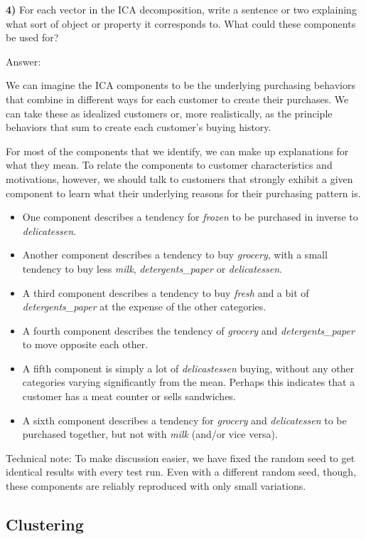 \documentclass{article}
\begin{document}
    \textbf{4)} For each vector in the ICA decomposition, write a sentence
or two explaining what sort of object or property it corresponds to.
What could these components be used for?

    Answer:

We can imagine the ICA components to be the underlying purchasing
behaviors that combine in different ways for each customer to create
their purchases. We can take these as idealized customers or, more
realistically, as the principle behaviors that sum to create each
customer's buying history.

For most of the components that we identify, we can make up explanations
for what they mean. To relate the components to customer characteristics
and motivations, however, we should talk to customers that strongly
exhibit a given component to learn what their underlying reasons for
their purchasing pattern is.

\begin{itemize}
\item
  One component describes a tendency for \emph{frozen} to be purchased
  in inverse to \emph{delicatessen}.
\item
  Another component describes a tendency to buy \emph{grocery}, with a
  small tendency to buy less \emph{milk}, \emph{detergents\_paper} or
  \emph{delicatessen}.
\item
  A third component describes a tendency to buy \emph{fresh} and a bit
  of \emph{detergents\_paper} at the expense of the other categories.
\item
  A fourth component describes the tendency of \emph{grocery} and
  \emph{detergents\_paper} to move opposite each other.
\item
  A fifth component is simply a lot of \emph{delicastessen} buying,
  without any other categories varying significantly from the mean.
  Perhaps this indicates that a customer has a meat counter or sells
  sandwiches.
\item
  A sixth component describes a tendency for \emph{grocery} and
  \emph{delicatessen} to be purchased together, but not with \emph{milk}
  (and/or vice versa).
\end{itemize}

Technical note: To make discussion easier, we have fixed the random seed
to get identical results with every test run. Even with a different
random seed, though, these components are reliably reproduced with only
small variations.

    \subsection{Clustering}\label{clustering}
\end{document}
